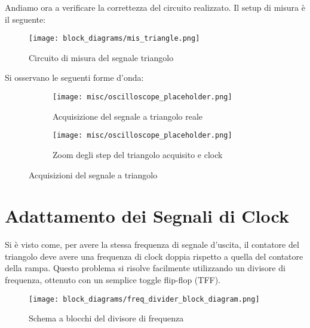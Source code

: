 
Andiamo ora a verificare la correttezza del circuito realizzato. Il setup di misura è il
seguente:
\medskip

\begin{figure}[ht]
    \centering
    \texttt{[image: block\_diagrams/mis\_triangle.png]}
    \caption{Circuito di misura del segnale triangolo}
    \label{mis_triangle}
\end{figure}

Si osservano le seguenti forme d'onda:
\medskip

\begin{figure}[ht]
    \centering

    \begin{subfigure}{.5\textwidth}
        \centering
        \texttt{[image: misc/oscilloscope\_placeholder.png]}
        \caption{Acquisizione del segnale a triangolo reale}
        \label{acq_triangle}
    \end{subfigure}%
    \begin{subfigure}{.5\textwidth}
        \centering
        \texttt{[image: misc/oscilloscope\_placeholder.png]}
        \caption{Zoom degli step del triangolo acquisito e clock}
        \label{acq_triangle_steps}
    \end{subfigure}

    \caption{Acquisizioni del segnale a triangolo}
    \label{acq_triangle_signals}
\end{figure}


\section{Adattamento dei Segnali di Clock}


Si è visto come, per avere la stessa frequenza di segnale d'uscita, il contatore del
triangolo deve avere una frequenza di clock doppia rispetto a quella del contatore della
rampa. Questo problema si risolve facilmente utilizzando un divisore di frequenza,
ottenuto con un semplice toggle flip-flop (TFF).
\medskip

\begin{figure}[ht]
    \centering
    \texttt{[image: block\_diagrams/freq\_divider\_block\_diagram.png]}
    \caption{Schema a blocchi del divisore di frequenza}
    \label{freq_divider_block_diagram}
\end{figure}

